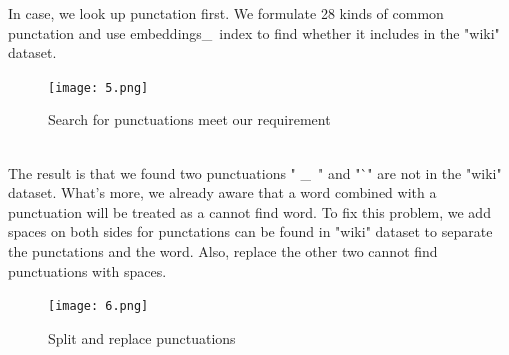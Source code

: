 \documentclass{article}
\begin{document}
\noindent In case, we look up punctation first. We formulate 28 kinds of common punctation and use embeddings\_\ index to find whether it includes in the "wiki" dataset.\\
\begin{figure}[h]
	\centering
	\texttt{[image: 5.png]}
	\caption{Search for punctuations meet our requirement}
\end{figure}\\
\noindent The result is that we found two punctuations " \_\ " and "`" are not in the "wiki" dataset. What's more, we already aware that a word combined with a punctuation will be treated as a cannot find word. To fix this problem, we add spaces on both sides for punctations can be found in "wiki" dataset to separate the punctations and the word. Also, replace the other two cannot find punctuations with spaces.\\
\begin{figure}[h]
	\centering
	\texttt{[image: 6.png]}
	\caption{Split and replace punctuations}
\end{figure}\\
\end{document}
